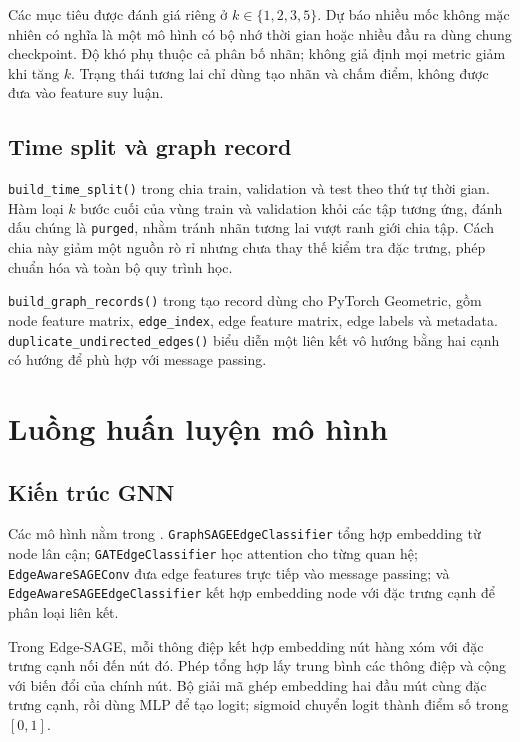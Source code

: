 \documentclass[12pt,a4paper]{article}
\newcommand{\code}[1]{{\small\texttt{#1}}}
\begin{document}
Các mục tiêu được đánh giá riêng ở \(k\in\{1,2,3,5\}\). Dự báo nhiều mốc không mặc nhiên có nghĩa là một mô hình có bộ nhớ thời gian hoặc nhiều đầu ra dùng chung checkpoint. Độ khó phụ thuộc cả phân bố nhãn; không giả định mọi metric giảm khi tăng \(k\). Trạng thái tương lai chỉ dùng tạo nhãn và chấm điểm, không được đưa vào feature suy luận.

\subsection{Time split và graph record}

\code{build\_time\_split()} trong  chia train, validation và test theo thứ tự thời gian. Hàm loại \(k\) bước cuối của vùng train và validation khỏi các tập tương ứng, đánh dấu chúng là \code{purged}, nhằm tránh nhãn tương lai vượt ranh giới chia tập. Cách chia này giảm một nguồn rò rỉ nhưng chưa thay thế kiểm tra đặc trưng, phép chuẩn hóa và toàn bộ quy trình học.

\code{build\_graph\_records()} trong  tạo record dùng cho PyTorch Geometric, gồm node feature matrix, \code{edge\_index}, edge feature matrix, edge labels và metadata. \code{duplicate\_undirected\_edges()} biểu diễn một liên kết vô hướng bằng hai cạnh có hướng để phù hợp với message passing.

\section{Luồng huấn luyện mô hình}
\label{sec:training}

\subsection{Kiến trúc GNN}

Các mô hình nằm trong . \code{GraphSAGEEdgeClassifier} tổng hợp embedding từ node lân cận; \code{GATEdgeClassifier} học attention cho từng quan hệ; \code{EdgeAwareSAGEConv} đưa edge features trực tiếp vào message passing; và \code{EdgeAwareSAGEEdgeClassifier} kết hợp embedding node với đặc trưng cạnh để phân loại liên kết.

Trong Edge-SAGE, mỗi thông điệp kết hợp embedding nút hàng xóm với đặc trưng cạnh nối đến nút đó. Phép tổng hợp lấy trung bình các thông điệp và cộng với biến đổi của chính nút. Bộ giải mã ghép embedding hai đầu mút cùng đặc trưng cạnh, rồi dùng MLP để tạo logit; sigmoid chuyển logit thành điểm số trong \([0,1]\).
\end{document}
